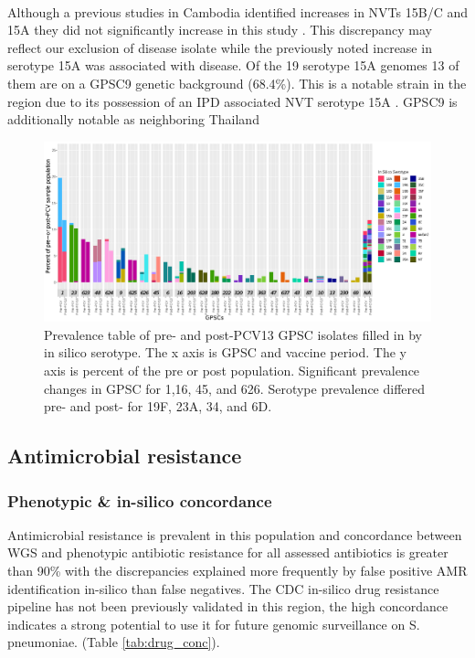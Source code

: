 \documentclass{article}
\begin{document}
\\Although a previous studies in Cambodia identified increases in NVTs 15B/C and 15A they did not significantly increase in this study \cite{turnerImpact13ValentPneumococcal2020}. This discrepancy may reflect our exclusion of disease isolate while the previously noted increase in serotype 15A was associated with disease. Of the 19 serotype 15A genomes 13 of them are on a GPSC9 genetic background (68.4\%). This is a notable strain in the region due to its possession of an IPD associated NVT serotype 15A \cite{turnerImpact13ValentPneumococcal2020}. GPSC9 is additionally notable as neighboring Thailand
\begin{figure}
    \centering
    \includegraphics[width=\textwidth]{prepost_gpsc.png}
    \caption{Prevalence table of pre- and post-PCV13 GPSC isolates filled in by in silico serotype. The x axis is GPSC and vaccine period. The y axis is percent of the pre or post population. Significant prevalence changes in GPSC for 1,16, 45, and 626.  Serotype prevalence differed pre- and post- for 19F, 23A, 34, and 6D.}
    \label{fig:prepost}
\end{figure}
\subsection{Antimicrobial resistance}
\subsubsection{Phenotypic \& in-silico concordance}
Antimicrobial resistance is prevalent in this population and concordance between WGS and phenotypic antibiotic resistance for all assessed antibiotics is greater than 90\% with the discrepancies explained more frequently by false positive AMR identification in-silico than false negatives. The CDC in-silico drug resistance pipeline has not been previously validated in this region, the high concordance indicates a strong potential to use it for future genomic surveillance on S. pneumoniae. (Table \ref{tab:drug_conc}). 
\end{document}
